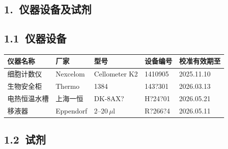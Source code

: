 \documentclass[UTF8,10pt,a4paper,fontset=fandol]{ctexart}
\newcommand{\fieldvalue}[1]{#1}
\newcommand{\handwritten}[1]{#1}
\begin{document}
\begin{center}
\begin{center}
\section*{1.\ 仪器设备及试剂}

\subsection*{1.1\ 仪器设备}

\begin{tabularx}{\textwidth}{|l|l|l|X|X|}
\hline
仪器名称 & 厂家 & 型号 & 设备编号 & 校准有效期至\\
\hline
细胞计数仪 & Nexcelom & Cellometer K2 &
\fieldvalue{\handwritten{1410905}} &
\fieldvalue{\handwritten{2025.11.10}}\\
\hline
生物安全柜 & Thermo & 1384 &
\fieldvalue{\handwritten{143?301}} &
\fieldvalue{\handwritten{2026.03.13}}\\
\hline
电热恒温水槽 & 上海一恒 &
\fieldvalue{\handwritten{DK-8AX?}} &
\fieldvalue{\handwritten{H?24?01}} &
\fieldvalue{\handwritten{2026.05.21}}\\
\hline
移液器 & Eppendorf &
\fieldvalue{\handwritten{2--20\,$\mu$l}} &
\fieldvalue{\handwritten{R?266?4}} &
\fieldvalue{\handwritten{2026.05.11}}\\
\hline
\end{tabularx}

\subsection*{1.2\ 试剂}


\end{center}
\end{center}
\end{document}
